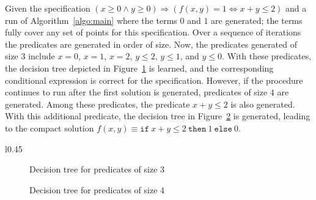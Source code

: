 \documentclass{llncs}
\newcommand\SynthFun{f}
\newcommand\node{v}
\begin{document}
\begin{example}
  \label{ex:continuing}
  Given the specification $(x \geq 0 \wedge y \geq 0) \Rightarrow
(\SynthFun(x, y) = 1 \Leftrightarrow x + y \leq 2)$ and a run of
Algorithm~\ref{algo:main} where the terms $0$ and $1$ are generated;
the terms fully cover any set of points for this specification.
Over a sequence of iterations the predicates are generated in order
of size.  Now, the predicates generated of size $3$
include $x = 0$, $x = 1$, $x = 2$, $y \leq 2$, $y \leq 1$, and $y \leq
0$.  With these predicates, the decision tree depicted in
Figure~\ref{fig:dt:large} is learned, and the corresponding
conditional expression is correct for the specification.  However, if
the procedure continues to run after the first solution is generated,
predicates of size $4$ are generated.  Among these predicates, the
predicate $x + y \leq 2$ is also generated.  With this additional
predicate, the decision tree in Figure~\ref{fig:dt:small} is
generated, leading to the compact solution $\SynthFun(x, y) \equiv
\mathtt{if}~x + y \leq 2~\mathtt{then}~1~\mathtt{else}~0$.
\end{example}

\begin{wrapfigure}{l}{0.45\textwidth}
  \begin{subfigure}{0.45\textwidth}
    \centering
    \caption{Decision tree for predicates of size $3$}
    \label{fig:dt:large}
  \end{subfigure}
  \begin{subfigure}{0.45\textwidth}
    \centering
    \caption{Decision tree for predicates of size $4$}
    \label{fig:dt:small}
  \end{subfigure}
  \vspace*{-2ex}
\end{wrapfigure}
\end{document}
